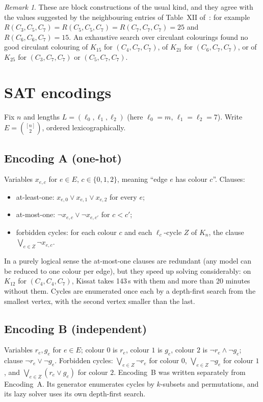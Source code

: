 \documentclass[11pt]{amsart}
\theoremstyle{definition}
\theoremstyle{remark}
\newtheorem{remark}[theorem]{Remark}
\begin{document}
\begin{remark}
These are block constructions of the usual kind, and they agree with the values suggested by the neighbouring entries of Table~XII
of~\cite{Rad}: for example $R(C_3,C_5,C_7)=R(C_5,C_5,C_7)=R(C_7,C_7,C_7)=25$ and $R(C_6,C_6,C_7)=15$. An exhaustive search over
circulant colourings found no good circulant colouring of $K_{15}$ for $(C_4,C_7,C_7)$, of $K_{21}$ for $(C_6,C_7,C_7)$, or of
$K_{25}$ for $(C_3,C_7,C_7)$ or $(C_5,C_7,C_7)$.
\end{remark}

\section{SAT encodings}\label{sec:sat}

Fix $n$ and lengths $L=(\ell_0,\ell_1,\ell_2)$ (here $\ell_0=m$, $\ell_1=\ell_2=7$). Write $E=\binom{[n]}{2}$, ordered
lexicographically.

\subsection{Encoding A (one-hot)}
Variables $x_{e,c}$ for $e\in E$, $c\in\{0,1,2\}$, meaning ``edge $e$ has colour $c$''. Clauses:
\begin{itemize}
\item at-least-one: $x_{e,0}\vee x_{e,1}\vee x_{e,2}$ for every $e$;
\item at-most-one: $\neg x_{e,c}\vee\neg x_{e,c'}$ for $c<c'$;
\item forbidden cycles: for each colour $c$ and each $\ell_c$-cycle $Z$ of $K_n$, the clause $\bigvee_{e\in Z}\neg x_{e,c}$.
\end{itemize}
In a purely logical sense the at-most-one clauses are redundant (any model can be reduced to one colour per edge), but they speed up
solving considerably: on $K_{12}$ for $(C_4,C_4,C_7)$, Kissat takes 143\,s with them and more than 20 minutes without them. Cycles are
enumerated once each by a depth-first search from the smallest vertex, with the second vertex smaller than the last.

\subsection{Encoding B (independent)}
Variables $r_e, g_e$ for $e\in E$; colour $0$ is $r_e$, colour $1$ is $g_e$, colour $2$ is $\neg r_e\wedge\neg g_e$; clause
$\neg r_e\vee\neg g_e$. Forbidden cycles: $\bigvee_{e\in Z}\neg r_e$ for colour $0$, $\bigvee_{e\in Z}\neg g_e$ for colour $1$, and
$\bigvee_{e\in Z}(r_e\vee g_e)$ for colour $2$. Encoding~B was written separately from Encoding~A. Its generator enumerates cycles by
$k$-subsets and permutations, and its lazy solver uses its own depth-first search.
\end{document}
